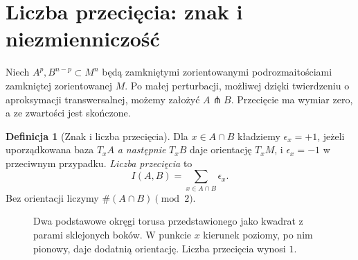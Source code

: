 \documentclass[11pt,a4paper,oneside]{report}
\theoremstyle{plain}
\theoremstyle{definition}
\newtheorem{definicja}[twierdzenie]{Definicja}
\theoremstyle{remark}
\begin{document}
\section{Liczba przecięcia: znak i niezmienniczość}
\label{sec:przeciecia-16}

Niech $A^p,B^{n-p}\subset M^n$ będą
zamkniętymi zorientowanymi
podrozmaitościami zamkniętej
zorientowanej $M$. Po małej
perturbacji, możliwej dzięki twierdzeniu o aproksymacji transwersalnej,
możemy założyć $A\pitchfork B$.
Przecięcie ma wymiar zero,
a ze zwartości jest skończone.

\begin{definicja}[Znak i liczba przecięcia]
\label{def:liczba-przeciecia-16}
Dla $x\in A\cap B$ kładziemy
$\epsilon_x=+1$, jeżeli
uporządkowana baza
$T_xA$ \emph{a następnie}
$T_xB$ daje orientację $T_xM$,
i $\epsilon_x=-1$ w przeciwnym
przypadku. \emph{Liczba
przecięcia} to
\[
 I(A,B)=\sum_{x\in A\cap B}\epsilon_x.
\]
Bez orientacji liczymy
$\#(A\cap B)\pmod 2$.
\end{definicja}

\begin{figure}[htbp]
\centering
{}
\caption{Dwa podstawowe okręgi torusa
przedstawionego jako kwadrat z parami
sklejonych boków. W punkcie $x$ kierunek
poziomy, po nim pionowy, daje dodatnią
orientację. Liczba przecięcia wynosi $1$.}
\label{fig:przeciecie-torus-16}
\end{figure}
\end{document}

